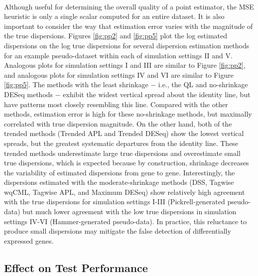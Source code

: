 \documentclass[10pt]{article}
\begin{document}
\paragraph{} \indent Although useful for determining the overall quality of a point estimator, the MSE heuristic is only a single scalar computed for an entire dataset. It is also important to consider the way that estimation error varies with the magnitude of the true dispersions. Figures \ref{fig:pp2} and \ref{fig:pp5} plot the log estimated dispersions on the log true dispersions for several dispersion estimation methods for an example pseudo-dataset within each of simulation settings II and V. Analogous plots for simulation settings I and III are similar to Figure \ref{fig:pp2}, and analogous plots for simulation settings IV and VI are similar to Figure \ref{fig:pp5}. The methods with the least shrinkage $-$ i.e., the QL and no-shrinkage DESeq methods $-$ exhibit the widest vertical spread about the identity line, but have patterns most closely resembling this line. Compared with the other methods, estimation error is high for these no-shrinkage methods, but maximally correlated with true dispersion magnitude. On the other hand, both of the trended methods (Trended APL and Trended DESeq) show the lowest vertical spreads, but the greatest systematic departures from the identity line. These trended methods underestimate large true dispersions and overestimate small true dispersions, which is expected because by construction, shrinkage decreases the variability of estimated dispersions from gene to gene. Interestingly, the dispersions estimated with the moderate-shrinkage methods (DSS, Tagwise wqCML, Tagwise APL, and Maximum DESeq) show relatively high agreement with the true dispersions for simulation settings I-III (Pickrell-generated pseudo-data) but much lower agreement with the low true dispersions in simulation settings IV-VI (Hammer-generated pseudo-data). In practice, this reluctance to produce small dispersions may mitigate the false detection of differentially expressed genes.

\subsection*{Effect on Test Performance} \label{subsec:test}
\end{document}
